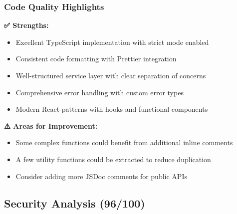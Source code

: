 \documentclass[11pt,a4paper]{article}
\begin{document}
\subsubsection{Code Quality Highlights}

\begin{tcolorbox}[colback=successGreen!10,colframe=successGreen]
\textbf{✅ Strengths:}
\begin{itemize}
    \item Excellent TypeScript implementation with strict mode enabled
    \item Consistent code formatting with Prettier integration
    \item Well-structured service layer with clear separation of concerns
    \item Comprehensive error handling with custom error types
    \item Modern React patterns with hooks and functional components
\end{itemize}
\end{tcolorbox}

\begin{tcolorbox}[colback=warningOrange!10,colframe=warningOrange]
\textbf{⚠️ Areas for Improvement:}
\begin{itemize}
    \item Some complex functions could benefit from additional inline comments
    \item A few utility functions could be extracted to reduce duplication
    \item Consider adding more JSDoc comments for public APIs
\end{itemize}
\end{tcolorbox}

\subsection{Security Analysis (96/100)}
\end{document}

